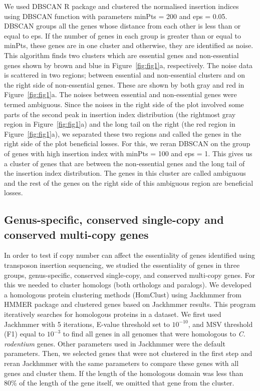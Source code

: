 \documentclass[12pt,letterpaper]{article}
\begin{document}
We used DBSCAN R package \cite{ester_density-based_1996} and clustered the normalised insertion indices using DBSCAN function with parameters minPts = 200 and eps = 0.05. DBSCAN groups all the genes whose distance from each other is less than or equal to eps. If the number of genes in each group is greater than or equal to minPts, these genes are in one cluster and otherwise, they are identified as noise. This algorithm finds two clusters which are essential genes and non-essential genes shown by brown and blue in Figure~\ref{fig:fig1}a, respectively. The noise data is scattered in two regions; between essential and non-essential clusters and on the right side of non-essential genes. These are shown by both gray and red in Figure~\ref{fig:fig1}a. The noises between essential and non-essential genes were termed ambiguous. Since the noises in the right side of the plot involved some parts of the second peak in insertion index distribution (the rightmost gray region in Figure~\ref{fig:fig1}a) and the long tail on the right (the red region in Figure~\ref{fig:fig1}a), we separated these two regions and called the genes in the right side of the plot beneficial losses. For this, we reran DBSCAN on the group of genes with high insertion index with minPts = 100 and eps = 1. This gives us a cluster of genes that are between the non-essential genes and the long tail of the insertion index distribution. The genes in this cluster are called ambiguous and the rest of the genes on the right side of this ambiguous region are beneficial losses.

\subsection{Genus-specific, conserved single-copy and conserved multi-copy genes}\label{meth:homclust}
In order to test if copy number can affect the essentiality of genes identified using transposon insertion sequencing, we studied the essentiality of genes in three groups, genus-specific, conserved single-copy, and conserved multi-copy genes. For this we needed to cluster homologs (both orthologs and paralogs). We developed a homologous protein clustering methods (HomClust) using Jackhmmer from HMMER package \cite{eddy_accelerated_2011} and clustered genes based on Jackhmmer results. This program iteratively searches for homologous proteins in a dataset. We first used Jackhmmer with 5 iterations, E-value threshold set to $10^{-10}$, and MSV threshold (F1) equal to $10^{-3}$ to find all genes in all genomes that were homologous to \textit{C. rodentium} genes. Other parameters used in Jackhmmer were the default parameters. Then, we selected genes that were not clustered in the first step and reran Jackhmmer with the same parameters to compare these genes with all genes and cluster them. If the length of the homologous domain was less than $80\%$ of the length of the gene itself, we omitted that gene from the cluster.
\end{document}
